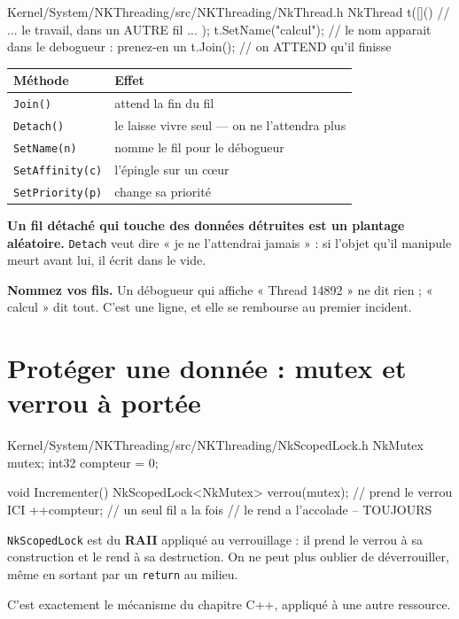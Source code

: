 \begin{nkcode}{Kernel/System/NKThreading/src/NKThreading/NkThread.h}
NkThread t([]() {
    // ... le travail, dans un AUTRE fil ...
});
t.SetName("calcul");        // le nom apparait dans le debogueur : prenez-en un
t.Join();                   // on ATTEND qu'il finisse
\end{nkcode}

\begin{center}
\begin{tabular}{@{}ll@{}}
\toprule
\textbf{Méthode} & \textbf{Effet} \\
\midrule
\texttt{Join()} & attend la fin du fil \\
\texttt{Detach()} & le laisse vivre seul --- on ne l'attendra plus \\
\texttt{SetName(n)} & nomme le fil pour le débogueur \\
\texttt{SetAffinity(c)} & l'épingle sur un c\oe ur \\
\texttt{SetPriority(p)} & change sa priorité \\
\bottomrule
\end{tabular}
\end{center}

\begin{nkpiege}
\textbf{Un fil détaché qui touche des données détruites est un plantage
aléatoire.} \texttt{Detach} veut dire « je ne l'attendrai jamais » : si l'objet
qu'il manipule meurt avant lui, il écrit dans le vide.

\textbf{Nommez vos fils.} Un débogueur qui affiche « Thread 14892 » ne dit rien ;
« calcul » dit tout. C'est une ligne, et elle se rembourse au premier incident.
\end{nkpiege}

\section{Protéger une donnée : mutex et verrou à portée}

\begin{nkcode}{Kernel/System/NKThreading/src/NKThreading/NkScopedLock.h}
NkMutex mutex;
int32 compteur = 0;

void Incrementer() {
    NkScopedLock<NkMutex> verrou(mutex);   // prend le verrou ICI
    ++compteur;                            // un seul fil a la fois
}                                          // le rend a l'accolade -- TOUJOURS
\end{nkcode}

\begin{nkretenir}
\texttt{NkScopedLock} est du \textbf{RAII} appliqué au verrouillage : il prend le
verrou à sa construction et le rend à sa destruction. On ne peut plus oublier de
déverrouiller, même en sortant par un \texttt{return} au milieu.

C'est exactement le mécanisme du chapitre C++, appliqué à une autre ressource.
\end{nkretenir}

